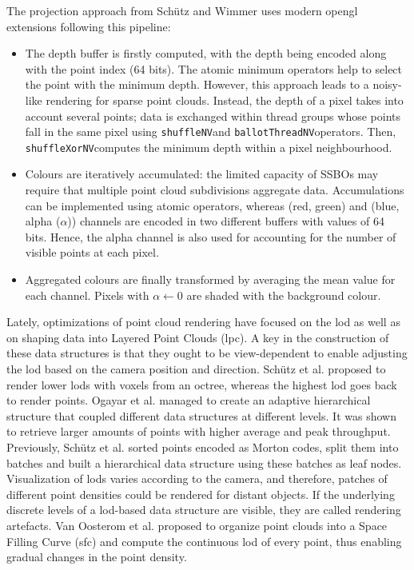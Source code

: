 \begin{kaobox}[frametitle=Compute shader core proposed by Schütz and Wimmer]
The projection approach from Schütz and Wimmer \cite{schutz_rendering_2021} uses modern \acrshort{opengl} extensions following this pipeline:
\begin{itemize}
    \item The depth buffer is firstly computed, with the depth being encoded along with the point index (64 bits). The atomic minimum operators help to select the point with the minimum depth. However, this approach leads to a noisy-like rendering for sparse point clouds. Instead, the depth of a pixel takes into account several points; data is exchanged within thread groups whose points fall in the same pixel using \small\verb|shuffleNV|\normalsize and \small\verb|ballotThreadNV|\normalsize operators. Then, \small\verb|shuffleXorNV|\normalsize computes the minimum depth within a pixel neighbourhood.
    \item Colours are iteratively accumulated: the limited capacity of SSBOs may require that multiple point cloud subdivisions aggregate data. Accumulations can be implemented using atomic operators, whereas (red, green) and (blue, alpha ($\alpha$)) channels are encoded in two different buffers with values of 64 bits. Hence, the alpha channel is also used for accounting for the number of visible points at each pixel.
    \item Aggregated colours are finally transformed by averaging the mean value for each channel. Pixels with $\alpha \gets 0$ are shaded with the background colour. 
\end{itemize}
\end{kaobox}

Lately, optimizations of point cloud rendering have focused on the \acrshort{lod} as well as on shaping data into Layered Point Clouds (\acrshort{lpc}). A key in the construction of these data structures is that they ought to be view-dependent to enable adjusting the \acrshort{lod} based on the camera position and direction. Schütz et al. \cite{schutz_gpu-accelerated_2023} proposed to render lower \acrshort{lod}s with voxels from an octree, whereas the highest \acrshort{lod} goes back to render points. Ogayar et al. \cite{ogayar-anguita_nested_2023} managed to create an adaptive hierarchical structure that coupled different data structures at different levels. It was shown to retrieve larger amounts of points with higher average and peak throughput. Previously, Schütz et al. \cite{schutz_software_2022} sorted points encoded as Morton codes, split them into batches and built a hierarchical data structure using these batches as leaf nodes. Visualization of \acrshort{lod}s varies according to the camera, and therefore, patches of different point densities could be rendered for distant objects. If the underlying discrete levels of a \acrshort{lod}-based data structure are visible, they are called rendering artefacts. Van Oosterom et al. \cite{van_oosterom_organizing_2022} proposed to organize point clouds into a Space Filling Curve (\acrshort{sfc}) and compute the continuous \acrshort{lod} of every point, thus enabling gradual changes in the point density. 

